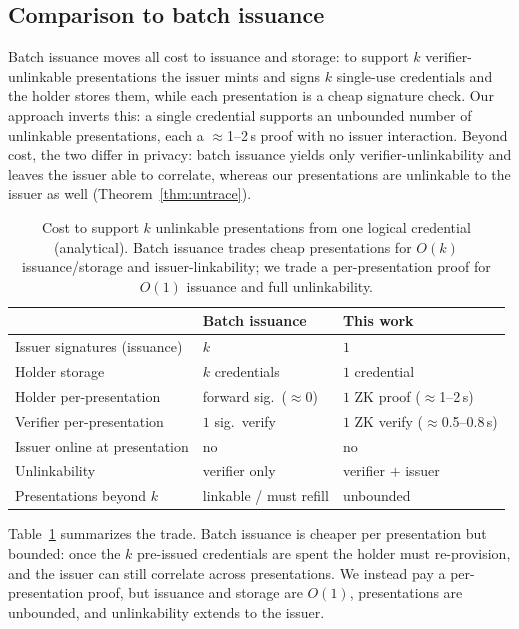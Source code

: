 \documentclass[11pt]{article}
\theoremstyle{plain}
\theoremstyle{definition}
\begin{document}
\subsection{Comparison to batch issuance}
Batch issuance moves all cost to issuance and storage: to support $k$
verifier-unlinkable presentations the issuer mints and signs $k$ single-use
credentials and the holder stores them, while each presentation is a cheap signature
check. Our approach inverts this: a single credential supports an unbounded number of
unlinkable presentations, each a $\approx$1--2\,s proof with no issuer interaction.
Beyond cost, the two differ in privacy: batch issuance yields only
verifier-unlinkability and leaves the issuer able to correlate, whereas our
presentations are unlinkable to the issuer as well (Theorem~\ref{thm:untrace}).

\begin{table}[t]\centering\small
\caption{Cost to support $k$ unlinkable presentations from one logical credential
(analytical). Batch issuance trades cheap presentations for $O(k)$ issuance/storage and
issuer-linkability; we trade a per-presentation proof for $O(1)$ issuance and full
unlinkability.}
\label{tab:batch}
\begin{tabular}{@{}lll@{}}
\toprule
 & Batch issuance & This work \\
\midrule
Issuer signatures (issuance)  & $k$                       & $1$ \\
Holder storage                & $k$ credentials           & $1$ credential \\
Holder per-presentation       & forward sig.\ ($\approx$0)& $1$ ZK proof ($\approx$1--2\,s) \\
Verifier per-presentation     & $1$ sig.\ verify          & $1$ ZK verify ($\approx$0.5--0.8\,s) \\
Issuer online at presentation & no                        & no \\
Unlinkability                 & verifier only             & verifier $+$ issuer \\
Presentations beyond $k$      & linkable / must refill    & unbounded \\
\bottomrule
\end{tabular}
\end{table}

Table~\ref{tab:batch} summarizes the trade. Batch issuance is cheaper per presentation
but bounded: once the $k$ pre-issued credentials are spent the holder must
re-provision, and the issuer can still correlate across presentations. We instead pay a
per-presentation proof, but issuance and storage are $O(1)$, presentations are
unbounded, and unlinkability extends to the issuer.
\end{document}

